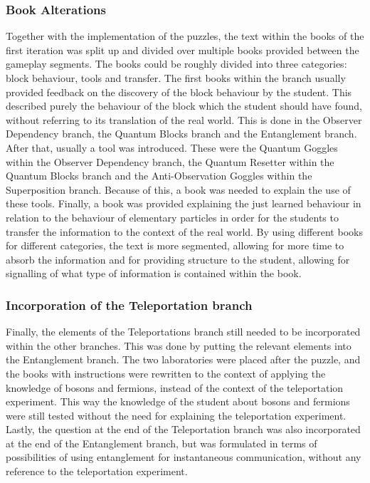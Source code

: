 \documentclass[11pt,twoside]{report} %
\begin{document}
\subsubsection{Book Alterations}

Together with the implementation of the puzzles, the text within the books of the first iteration was split up and divided over multiple books provided between the gameplay segments. The books could be roughly divided into three categories: block behaviour, tools and transfer. The first books within the branch usually provided feedback on the discovery of the block behaviour by the student. This described purely the behaviour of the block which the student should have found, without referring to its translation of the real world. This is done in the Observer Dependency branch, the Quantum Blocks branch and the Entanglement branch. After that, usually a tool was introduced. These were the Quantum Goggles within the Observer Dependency branch, the Quantum Resetter within the Quantum Blocks branch and the Anti-Observation Goggles within the Superposition branch. Because of this, a book was needed to explain the use of these tools. Finally, a book was provided explaining the just learned behaviour in relation to the behaviour of elementary particles in order for the students to transfer the information to the context of the real world. By using different books for different categories, the text is more segmented, allowing for more time to absorb the information and for providing structure to the student, allowing for signalling of what type of information is contained within the book.

\subsubsection{Incorporation of the Teleportation branch}

Finally, the elements of the Teleportations branch still needed to be incorporated within the other branches. This was done by putting the relevant elements into the Entanglement branch. The two laboratories were placed after the puzzle, and the books with instructions were rewritten to the context of applying the knowledge of bosons and fermions, instead of the context of the teleportation experiment. This way the knowledge of the student about bosons and fermions were still tested without the need for explaining the teleportation experiment. Lastly, the question at the end of the Teleportation branch was also incorporated at the end of the Entanglement branch, but was formulated in terms of possibilities of using entanglement for instantaneous communication, without any reference to the teleportation experiment.
\end{document}
